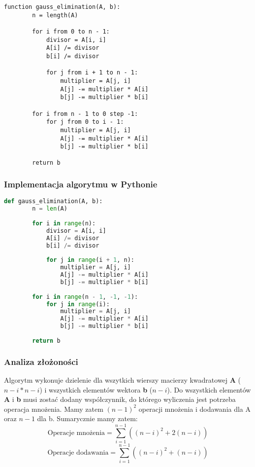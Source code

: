 \documentclass[12pt,a4paper,table]{article}
\begin{document}
    \begin{lstlisting}[]
    function gauss_elimination(A, b):
        n = length(A)
        
        for i from 0 to n - 1:
            divisor = A[i, i]
            A[i] /= divisor
            b[i] /= divisor
            
            for j from i + 1 to n - 1:
                multiplier = A[j, i]
                A[j] -= multiplier * A[i]
                b[j] -= multiplier * b[i]
        
        for i from n - 1 to 0 step -1:
            for j from 0 to i - 1:
                multiplier = A[j, i]
                A[j] -= multiplier * A[i]
                b[j] -= multiplier * b[i]
        
        return b

    \end{lstlisting}

    \subsubsection{Implementacja algorytmu w Pythonie}
    \begin{lstlisting}[language=Python]
    def gauss_elimination(A, b):
        n = len(A)
        
        for i in range(n):
            divisor = A[i, i]
            A[i] /= divisor
            b[i] /= divisor
            
            for j in range(i + 1, n):
                multiplier = A[j, i]
                A[j] -= multiplier * A[i]
                b[j] -= multiplier * b[i]
    
        for i in range(n - 1, -1, -1):
            for j in range(i):
                multiplier = A[j, i]
                A[j] -= multiplier * A[i]
                b[j] -= multiplier * b[i]
        
        return b

    \end{lstlisting}

    \subsubsection{Analiza złożoności}
    Algorytm wykonuje dzielenie dla wszytkich wierszy macierzy kwadratowej \textbf{A} ($n-i*n-i$) i wszystkich elementów wektora \textbf{b} ($n-i$). Do wszystkich elementów \textbf{A} i \textbf{b} musi zostać dodany współczynnik, do którego wyliczenia jest potrzeba operacja mnożenia. Mamy zatem $(n-1)^2$ operacji mnożenia i dodawania dla A oraz $n-1$ dla b. Sumarycznie mamy zatem:
    \begin{equation}
        \text{Operacje mnożenia} = \sum_{i=1}^{n-1} ((n - i)^2 + 2(n - i))  
    \end{equation}
    \begin{equation}
        \text{Operacje dodawania} = \sum_{i=1}^{n-1} ((n - i)^2 + (n - i))  
    \end{equation}
\end{document}

